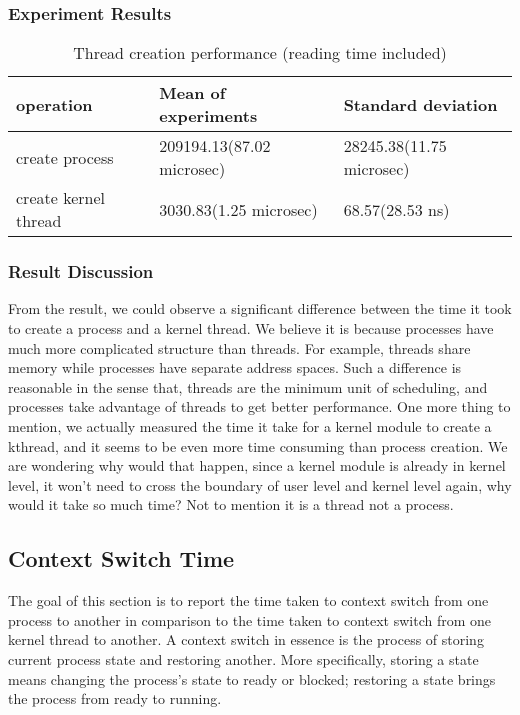 \documentclass{article} %
\begin{document}
\subsubsection{Experiment Results}
\begin{table}[h]
  \begin{center}
    \caption{Thread creation performance (reading time included)}
    \begin{tabular}{|l|l|l|}
      \hline
      operation            & Mean of experiments       & Standard deviation       \\ \hline
      create process       & 209194.13(87.02 microsec) & 28245.38(11.75 microsec) \\ \hline
      create kernel thread & 3030.83(1.25 microsec)    & 68.57(28.53 ns)          \\ \hline
    \end{tabular}
    \label{table:thread_creating_results}
  \end{center}
\end{table}


\subsubsection{Result Discussion}
From the result, we could observe a significant difference between the time it
took to create a process and a kernel thread. We believe it is because
processes have much more complicated structure than threads. For example,
threads share memory while processes have separate address spaces. Such
a difference is reasonable in the sense that, threads are the minimum unit of
scheduling, and processes take advantage of threads to get better performance.
One more thing to mention, we actually measured the time it take for a kernel
module to create a kthread, and it seems to be even more time consuming than
process creation. We are wondering why would that happen, since a kernel
module is already in kernel level, it won't need to cross the boundary of user
level and kernel level again, why would it take so much time? Not to mention
it is a thread not a process.

\subsection{Context Switch Time}
The goal of this section is to report the time taken to context switch from
one process to another in comparison to the time taken to context switch from
one kernel thread to another.  A context switch in essence is the process of
storing current process state and restoring another. More specifically,
storing a state means changing the process's state to ready or blocked;
restoring a state brings the process from ready to running.
\end{document}
